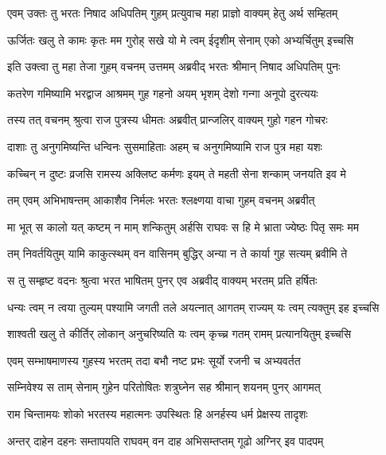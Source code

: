 
\twolineshloka
{एवम् उक्तः तु भरतः निषाद अधिपतिम् गुहम्}
{प्रत्युवाच महा प्राज्ञो वाक्यम् हेतु अर्थ सम्हितम्} %

\twolineshloka
{ऊर्जितः खलु ते कामः कृतः मम गुरोह् सखे}
{यो मे त्वम् ईदृशीम् सेनाम् एको अभ्यर्चितुम् इच्चसि} %

\twolineshloka
{इति उक्त्वा तु महा तेजा गुहम् वचनम् उत्तमम्}
{अब्रवीद् भरतः श्रीमान् निषाद अधिपतिम् पुनः} %

\twolineshloka
{कतरेण गमिष्यामि भरद्वाज आश्रमम् गुह}
{गहनो अयम् भृशम् देशो गन्गा अनूपो दुरत्ययः} %

\twolineshloka
{तस्य तत् वचनम् श्रुत्वा राज पुत्रस्य धीमतः}
{अब्रवीत् प्रान्जलिर् वाक्यम् गुहो गहन गोचरः} %

\twolineshloka
{दाशाः तु अनुगमिष्यन्ति धन्विनः सुसमाहिताः}
{अहम् च अनुगमिष्यामि राज पुत्र महा यशः} %

\twolineshloka
{कच्चिन् न दुष्टः व्रजसि रामस्य अक्लिष्ट कर्मणः}
{इयम् ते महती सेना शन्काम् जनयति इव मे} %

\twolineshloka
{तम् एवम् अभिभाषन्तम् आकाशैव निर्मलः}
{भरतः श्लक्ष्णया वाचा गुहम् वचनम् अब्रवीत्} %

\twolineshloka
{मा भूत् स कालो यत् कष्टम् न माम् शन्कितुम् अर्हसि}
{राघवः स हि मे भ्राता ज्येष्ठः पितृ समः मम} %

\twolineshloka
{तम् निवर्तयितुम् यामि काकुत्स्थम् वन वासिनम्}
{बुद्धिर् अन्या न ते कार्या गुह सत्यम् ब्रवीमि ते} %

\twolineshloka
{स तु सम्हृष्ट वदनः श्रुत्वा भरत भाषितम्}
{पुनर् एव अब्रवीद् वाक्यम् भरतम् प्रति हर्षितः} %

\twolineshloka
{धन्यः त्वम् न त्वया तुल्यम् पश्यामि जगती तले}
{अयत्नात् आगतम् राज्यम् यः त्वम् त्यक्तुम् इह इच्चसि} %

\twolineshloka
{शाश्वती खलु ते कीर्तिर् लोकान् अनुचरिष्यति}
{यः त्वम् कृच्च्र गतम् रामम् प्रत्यानयितुम् इच्चसि} %

\twolineshloka
{एवम् सम्भाषमाणस्य गुहस्य भरतम् तदा}
{बभौ नष्ट प्रभः सूर्यो रजनी च अभ्यवर्तत} %

\twolineshloka
{सम्निवेश्य स ताम् सेनाम् गुहेन परितोषितः}
{शत्रुघ्नेन सह श्रीमान् शयनम् पुनर् आगमत्} %

\twolineshloka
{राम चिन्तामयः शोको भरतस्य महात्मनः}
{उपस्थितः हि अनर्हस्य धर्म प्रेक्षस्य तादृशः} %

\twolineshloka
{अन्तर् दाहेन दहनः सम्तापयति राघवम्}
{वन दाह अभिसम्तप्तम् गूढो अग्निर् इव पादपम्} %

